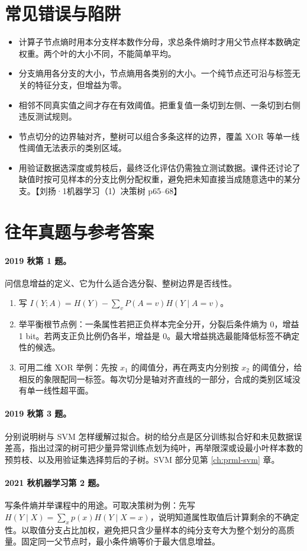 \documentclass[UTF8,a4paper,zihao=-4,fontset=fandol]{ctexrep}
\begin{document}
\section{常见错误与陷阱}
\begin{itemize}
\item 计算子节点熵时用本分支样本数作分母，求总条件熵时才用父节点样本数确定权重。两个叶的大小不同，不能简单平均。
\item 分支熵用各分支的大小，节点熵用各类别的大小。一个纯节点还可沿与标签无关的特征分支，但增益为零。
\item 相邻不同真实值之间才存在有效阈值。把重复值一条切到左侧、一条切到右侧违反测试规则。
\item 节点切分的边界轴对齐，整树可以组合多条这样的边界，覆盖 XOR 等单一线性阈值无法表示的类别区域。
\item 用验证数据选深度或剪枝后，最终泛化评估仍需独立测试数据。课件还讨论了缺值时按可见样本的分支比例分配权重，避免把未知直接当成随意选中的某分支。【刘扬·1机器学习（1）决策树 p65–68】
\end{itemize}

\section{往年真题与参考答案}
\paragraph{2019 秋第 1 题。} 问信息增益的定义、它为什么适合选分裂、整树边界是否线性。
\begin{enumerate}
\item 写 $I(Y;A)=H(Y)-\sum_vP(A=v)H(Y\mid A=v)$。
\item 举平衡根节点例：一条属性若把正负样本完全分开，分裂后条件熵为 0，增益 1 bit。若两支正负比例仍各半，增益是 0。最大增益挑选最能降低标签不确定性的候选。
\item 可用二维 XOR 举例：先按 $x_1$ 的阈值分，再在两支内分别按 $x_2$ 的阈值分，给相反的象限配同一标签。每次切分是轴对齐直线的一部分，合成的类别区域没有单一线性超平面。
\end{enumerate}
\paragraph{2019 秋第 3 题。} 分别说明树与 SVM 怎样缓解过拟合。树的给分点是区分训练拟合好和未见数据误差高，指出过深的树可把少量异常训练点划为纯叶，再举限深或设最小叶样本数的预剪枝、以及用验证集选择剪后的子树。SVM 部分见第 \ref{ch:prml-svm} 章。
\paragraph{2021 秋机器学习第 2 题。} 写条件熵并举课程中的用途。可取决策树为例：先写 $H(Y\mid X)=\sum_xp(x)H(Y\mid X=x)$，说明知道属性取值后计算剩余的不确定性。以取值分支占比加权，避免把只含少量样本的纯分支夸大为整个划分的高质量。固定同一父节点时，最小条件熵等价于最大信息增益。
\end{document}
